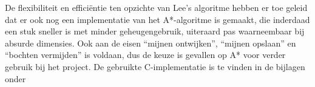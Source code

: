\documentclass{report}
\begin{document}
\noindent
De flexibiliteit en efficiëntie ten opzichte van Lee's algoritme hebben er toe geleid dat er ook nog een implementatie van het A*-algoritme is gemaakt, die inderdaad een stuk sneller is met minder geheugengebruik, uiteraard pas waarneembaar bij absurde dimensies.
Ook aan de eisen ``mijnen ontwijken'', ``mijnen opslaan'' en ``bochten vermijden'' is voldaan, dus de keuze is gevallen op A* voor verder gebruik bij het project.
De gebruikte C-implementatie is te vinden in de bijlagen onder \cite{sec:code-navigation}
\end{document}
